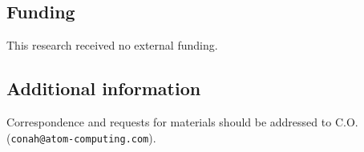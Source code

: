\documentclass[a4paper,unpublished,onecolumn,11pt]{quantumarticle}
\theoremstyle{definition}
\theoremstyle{remark}
\begin{document}
\begin{appendix}
\subsection*{Funding}
This research received no external funding.

\subsection*{Additional information}
Correspondence and requests for materials should be addressed to C.O.\\ (\texttt{conah@atom-computing.com}).

\end{appendix}









% 
\printbibliography
\end{document}
